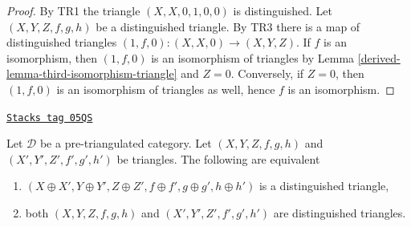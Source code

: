 \begin{proof}

By TR1 the triangle $(X, X, 0, 1, 0, 0)$ is distinguished.
Let $(X, Y, Z, f, g, h)$ be a distinguished triangle.
By TR3 there is a map of distinguished triangles
$(1, f, 0) : (X, X, 0) \to (X, Y, Z)$.
If $f$ is an isomorphism, then $(1, f, 0)$ is an isomorphism
of triangles by Lemma \ref{derived-lemma-third-isomorphism-triangle}
and $Z = 0$. Conversely, if $Z = 0$, then $(1, f, 0)$ is an
isomorphism of triangles as well, hence $f$ is an isomorphism.
\end{proof}

\begin{lemma}
\label{derived-lemma-direct-sum-triangles}
\href{https://stacks.math.columbia.edu/tag/05QS}{\texttt{Stacks tag 05QS}}

Let $\mathcal{D}$ be a pre-triangulated category.
Let $(X, Y, Z, f, g, h)$ and $(X', Y', Z', f', g', h')$ be triangles.
The following are equivalent
\begin{enumerate}
\item $(X \oplus X', Y \oplus Y', Z \oplus Z',
f \oplus f', g \oplus g', h \oplus h')$
is a distinguished triangle,
\item both $(X, Y, Z, f, g, h)$ and $(X', Y', Z', f', g', h')$ are
distinguished triangles.
\end{enumerate}
\end{lemma}

